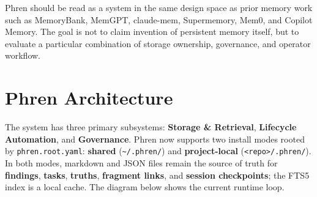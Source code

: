 \documentclass[10pt]{article}
\begin{document}
Phren should be read as a system in the same design space as prior memory work such as MemoryBank, MemGPT, claude-mem, Supermemory, Mem0, and Copilot Memory. The goal is not to claim invention of persistent memory itself, but to evaluate a particular combination of storage ownership, governance, and operator workflow.

\vspace{0.2em}
\section{Phren Architecture}
\label{sec:arch}

The system has three primary subsystems: \textbf{Storage \& Retrieval}, \textbf{Lifecycle Automation}, and \textbf{Governance}. Phren now supports two install modes rooted by \texttt{phren.root.yaml}: \textbf{shared} (\texttt{\textasciitilde/.phren/}) and \textbf{project-local} (\texttt{<repo>/.phren/}). In both modes, markdown and JSON files remain the source of truth for \textbf{findings}, \textbf{tasks}, \textbf{truths}, \textbf{fragment links}, and \textbf{session checkpoints}; the FTS5 index is a local cache. The diagram below shows the current runtime loop.
\end{document}
